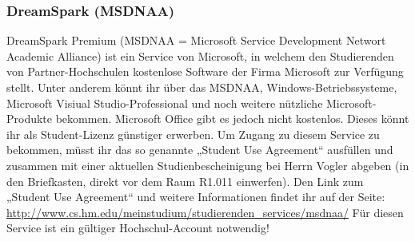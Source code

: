 \subsubsection{DreamSpark (MSDNAA)}
DreamSpark Premium (MSDNAA = Microsoft Service Development 
Networt Academic Alliance) ist ein Service von Microsoft, in welchem 
den Studierenden von Partner-Hochschulen kostenlose Software der 
Firma Microsoft zur Verfügung stellt. 
Unter anderem könnt ihr über das MSDNAA, Windows-Betriebssysteme, 
Microsoft Visiual Studio-Professional und noch weitere nützliche 
Microsoft-Produkte bekommen. Microsoft Office gibt es jedoch nicht 
kostenlos. Dieses könnt ihr als Student-Lizenz günstiger erwerben. 
Um Zugang zu diesem Service zu bekommen, müsst ihr das so genannte 
„Student Use Agreement“ ausfüllen und zusammen mit einer aktuellen 
Studienbescheinigung bei Herrn Vogler abgeben (in den Briefkasten, 
direkt vor dem Raum R1.011 einwerfen). 
Den Link zum „Student Use Agreement“ und weitere Informationen 
findet ihr auf der Seite: 
\url{http://www.cs.hm.edu/meinstudium/studierenden\_services/msdnaa/}
Für diesen Service ist ein gültiger Hochschul-Account notwendig!
